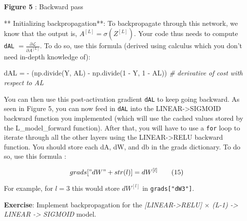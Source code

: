 \documentclass[11pt]{article}
\newenvironment{Shaded}{}{}
\newcommand{\DecValTok}[1]{\textcolor[rgb]{0.25,0.63,0.44}{{#1}}}
\newcommand{\CommentTok}[1]{\textcolor[rgb]{0.38,0.63,0.69}{\textit{{#1}}}}
\newcommand{\NormalTok}[1]{{#1}}
\begin{document}
\textbf{Figure 5} : Backward pass

** Initializing backpropagation**: To backpropagate through this
network, we know that the output is, $A^{[L]} = \sigma(Z^{[L]})$. Your
code thus needs to compute \texttt{dAL}
$= \frac{\partial \mathcal{L}}{\partial A^{[L]}}$. To do so, use this
formula (derived using calculus which you don't need in-depth knowledge
of):

\begin{Shaded}
\begin{Highlighting}[]
\NormalTok{dAL = - (np.divide(Y, AL) - np.divide(}\DecValTok{1} \NormalTok{- Y, }\DecValTok{1} \NormalTok{- AL)) }\CommentTok{# derivative of cost with respect to AL}
\end{Highlighting}
\end{Shaded}

You can then use this post-activation gradient \texttt{dAL} to keep
going backward. As seen in Figure 5, you can now feed in \texttt{dAL}
into the LINEAR-\textgreater{}SIGMOID backward function you implemented
(which will use the cached values stored by the L\_model\_forward
function). After that, you will have to use a \texttt{for} loop to
iterate through all the other layers using the LINEAR-\textgreater{}RELU
backward function. You should store each dA, dW, and db in the grads
dictionary. To do so, use this formula :

\[grads["dW" + str(l)] = dW^{[l]}\tag{15} \]

For example, for $l=3$ this would store $dW^{[l]}$ in
\texttt{grads{[}"dW3"{]}}.

\textbf{Exercise}: Implement backpropagation for the
\emph{{[}LINEAR-\textgreater{}RELU{]} $\times$ (L-1) -\textgreater{}
LINEAR -\textgreater{} SIGMOID} model.
\end{document}
